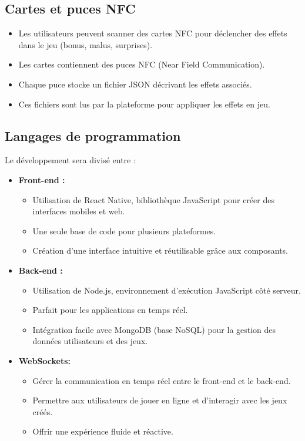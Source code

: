 \documentclass{article}                             %
\begin{document}
\subsection{Cartes et puces NFC}
\begin{itemize}[leftmargin=1.5em]
  \item Les utilisateurs peuvent scanner des cartes NFC pour déclencher des effets dans le jeu (bonus, malus, surprises).
  \item Les cartes contiennent des puces NFC (Near Field Communication).
  \item Chaque puce stocke un fichier JSON décrivant les effets associés.
  \item Ces fichiers sont lus par la plateforme pour appliquer les effets en jeu.
\end{itemize}

\subsection{Langages de programmation}
Le développement sera divisé entre :
    \begin{itemize}[leftmargin=1.5em]
      \item \textbf{Front-end :}
        \begin{itemize}[leftmargin=1.5em]
          \item Utilisation de React Native, bibliothèque JavaScript pour créer des interfaces mobiles et web.
          \item Une seule base de code pour plusieurs plateformes.
          \item Création d'une interface intuitive et réutilisable grâce aux composants.
        \end{itemize}

      \item \textbf{Back-end :}
        \begin{itemize}[leftmargin=1.5em]
          \item Utilisation de Node.js, environnement d’exécution JavaScript côté serveur.
          \item Parfait pour les applications en temps réel.
          \item Intégration facile avec MongoDB (base NoSQL) pour la gestion des données utilisateurs et des jeux.
        \end{itemize}

      \item \textbf{WebSockets:}
        \begin{itemize}[leftmargin=1.5em]
          \item Gérer la communication en temps réel entre le front-end et le back-end.
          \item Permettre aux utilisateurs de jouer en ligne et d'interagir avec les jeux créés.
          \item Offrir une expérience fluide et réactive.
        \end{itemize}
    \end{itemize}
\end{document}
